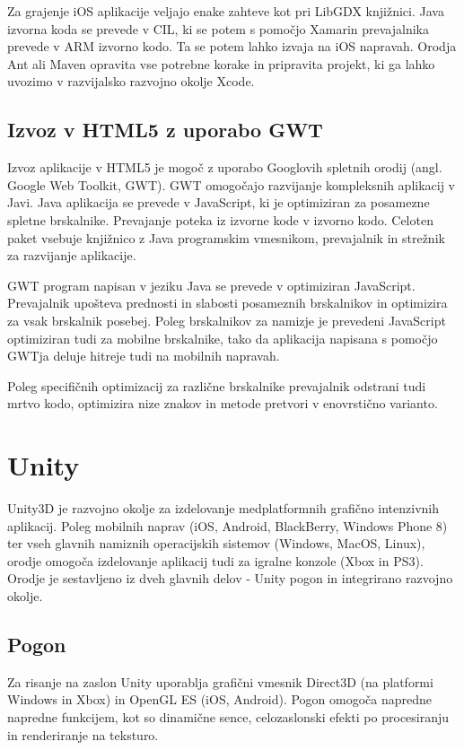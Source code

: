 Za grajenje iOS aplikacije veljajo enake zahteve kot pri LibGDX knjižnici. Java izvorna koda se prevede v CIL, ki se potem s pomočjo Xamarin prevajalnika prevede v ARM izvorno kodo. Ta se potem lahko izvaja na iOS napravah. Orodja Ant ali Maven opravita vse potrebne korake in pripravita projekt, ki ga lahko uvozimo v razvijalsko razvojno okolje Xcode.

\subsection{Izvoz v HTML5 z uporabo GWT}

Izvoz aplikacije v HTML5 je mogoč z uporabo Googlovih spletnih orodij (angl. Google Web Toolkit, GWT). GWT omogočajo razvijanje kompleksnih aplikacij v Javi. Java aplikacija se prevede v JavaScript, ki je optimiziran za posamezne spletne brskalnike. Prevajanje poteka iz izvorne kode v izvorno kodo. Celoten paket vsebuje knjižnico z Java programskim vmesnikom, prevajalnik in strežnik za razvijanje aplikacije.

GWT program napisan v jeziku Java se prevede v optimiziran JavaScript. Prevajalnik upošteva prednosti in slabosti posameznih brskalnikov in optimizira za vsak brskalnik posebej. Poleg brskalnikov za namizje je prevedeni JavaScript optimiziran tudi za mobilne brskalnike, tako da aplikacija napisana s pomočjo GWTja deluje hitreje tudi na mobilnih napravah.

Poleg specifičnih optimizacij za različne brskalnike prevajalnik odstrani tudi mrtvo kodo, optimizira nize znakov in metode pretvori v enovrstično varianto.

\section{Unity}
\label{sec:unity}

Unity3D \cite{unity} je razvojno okolje za izdelovanje medplatformnih grafično intenzivnih aplikacij. Poleg mobilnih naprav (iOS, Android, BlackBerry, Windows Phone 8) ter vseh glavnih namiznih operacijskih sistemov (Windows, MacOS, Linux), orodje omogoča izdelovanje aplikacij tudi za igralne konzole (Xbox in PS3). Orodje je sestavljeno iz dveh glavnih delov - Unity pogon in integrirano razvojno okolje.

\subsection{Pogon}

Za risanje na zaslon Unity uporablja grafični vmesnik Direct3D (na platformi Windows in Xbox) in OpenGL ES (iOS, Android). Pogon omogoča napredne napredne funkcijem, kot so dinamične sence, celozaslonski efekti po procesiranju in renderiranje na teksturo. 

